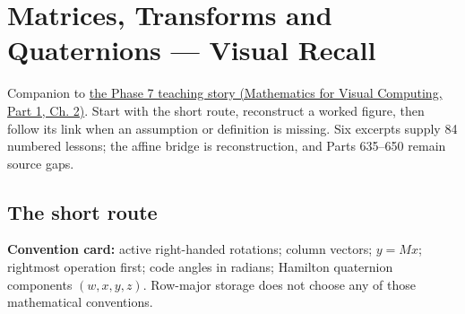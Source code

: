 \hypertarget{appendix-68f22c734be3}{}\label{referencestart:appendix-68f22c734be3}
\section{Matrices, Transforms and Quaternions --- Visual Recall}\label{appendix-68f22c734be3-matrices-transforms-and-quaternions-visual-recall}

\hypertarget{appendix-68f22c734be3-matrices-transforms-and-quaternions-visual-recall}{}

Companion to \href{../02-Mathematics-for-Visual-Computing-P01/main.pdf\#nameddest=01-foundations-i-ch018-keep-the-promises-visible-while-moving-between-representations}{the Phase 7 teaching story (Mathematics for Visual Computing, Part 1, Ch. 2)}. Start with the short route, reconstruct a worked figure, then follow its link when an assumption or definition is missing. Six excerpts supply 84 numbered lessons; the affine bridge is reconstruction, and Parts 635--650 remain source gaps.

\subsection{The short route}\label{appendix-68f22c734be3-the-short-route}

\hypertarget{appendix-68f22c734be3-the-short-route}{}


\textbf{Convention card:} active right-handed rotations; column vectors; \(y=Mx\); rightmost operation first; code angles in radians; Hamilton quaternion components \((w,x,y,z)\). Row-major storage does not choose any of those mathematical conventions.

